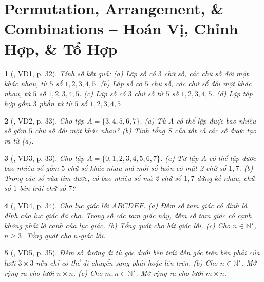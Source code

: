 \documentclass{article}
\newtheorem{baitoan}{}
\begin{document}

\section{Permutation, Arrangement, \& Combinations -- Hoán Vị, Chỉnh Hợp, \& Tổ Hợp}

\begin{baitoan}[\cite{Hai_Hung_Thu_Tung_ncpt_Toan_10_tap_2}, VD1, p. 32]
	Tính số kết quả: (a) Lập số có $3$ chữ số, các chữ số đôi một khác nhau, từ $5$ số $1,2,3,4,5$. (b) Lập số có $5$ chữ số, các chữ số đôi một khác nhau, từ $5$ số $1,2,3,4,5$. (c) Lập số có $3$ chữ số từ $5$ số $1,2,3,4,5$. (d) Lập tập hợp gồm $3$ phần tử từ $5$ số $1,2,3,4,5$.
\end{baitoan}

\begin{baitoan}[\cite{Hai_Hung_Thu_Tung_ncpt_Toan_10_tap_2}, VD2, p. 33]
	Cho tập $A = \{3,4,5,6,7\}$. (a) Từ $A$ có thể lập được bao nhiêu số gồm $5$ chữ số đôi một khác nhau? (b) Tính tổng $S$ của tất cả các số được tạo ra từ (a).
\end{baitoan}

\begin{baitoan}[\cite{Hai_Hung_Thu_Tung_ncpt_Toan_10_tap_2}, VD3, p. 33]
	Cho tập $A = \{0,1,2,3,4,5,6,7\}$. (a) Từ tập $A$ có thể lập được bao nhiêu số gồm $5$ chữ số khác nhau mà mỗi số luôn có mặt 2 chữ số $1,7$. (b) Trong các số vừa tìm được, có bao nhiêu số mà 2 chữ số $1,7$ đứng kề nhau, chữ số $1$ bên trái chữ số $7$?
\end{baitoan}

\begin{baitoan}[\cite{Hai_Hung_Thu_Tung_ncpt_Toan_10_tap_2}, VD4, p. 34]
	Cho lục giác lồi $ABCDEF$. (a) Đếm số tam giác có đỉnh là đỉnh của lục giác đã cho. Trong số các tam giác này, đếm số tam giác có cạnh không phải là cạnh của lục giác. (b) Tổng quát cho bát giác lồi. (c) Cho $n\in\mathbb{N}^\star$, $n\ge3$. Tổng quát cho $n$-giác lồi.
\end{baitoan}

\begin{baitoan}[\cite{Hai_Hung_Thu_Tung_ncpt_Toan_10_tap_2}, VD5, p. 35]
	Đếm số đường đi từ góc dưới bên trái đến góc trên bên phải của lưới $3\times3$ nếu chỉ có thể di chuyển sang phải hoặc lên trên. (b) Cho $n\in\mathbb{N}^\star$. Mở rộng ra cho lưới $n\times n$. (c) Cho $m,n\in\mathbb{N}^\star$. Mở rộng ra cho lưới $m\times n$.
\end{baitoan}
\end{document}

